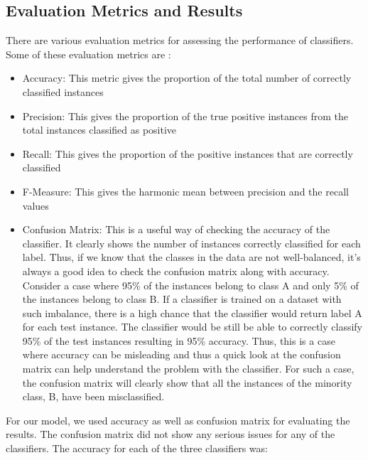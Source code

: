 \documentclass[sigconf]{acmart}
\begin{document}
\subsection{Evaluation Metrics and Results}
There are various evaluation metrics for assessing the performance of classifiers. Some of these evaluation metrics are \cite{hossin2015review}:
\begin{itemize}
	\item Accuracy: This metric gives the proportion of the total number of correctly classified instances
	\item Precision: This gives the proportion of the true positive instances from the total instances classified as positive
	\item Recall: This gives the proportion of the positive instances that are correctly classified
	\item F-Measure: This gives the harmonic mean between precision and the recall values
	\item Confusion Matrix: This is a useful way of checking the accuracy of the classifier. It clearly shows the number of instances correctly classified for each label. Thus, if we know that the classes in the data are not well-balanced, it's always a good idea to check the confusion matrix along with accuracy. Consider a case where 95\% of the instances belong to class A and only 5\% of the instances belong to class B. If a classifier is trained on a dataset with such imbalance, there is a high chance that the classifier would return label A for each test instance. The classifier would be still be able to correctly classify 95\% of the test instances resulting in 95\% accuracy. Thus, this is a case where accuracy can be misleading and thus a quick look at the confusion matrix can help understand the problem with the classifier. For such a case, the confusion matrix will clearly show that all the instances of the minority class, B, have been misclassified.
\end{itemize}

For our model, we used accuracy as well as confusion matrix for evaluating the results. The confusion matrix did not show any serious issues for any of the classifiers. The accuracy for each of the three classifiers was:
\end{document}
